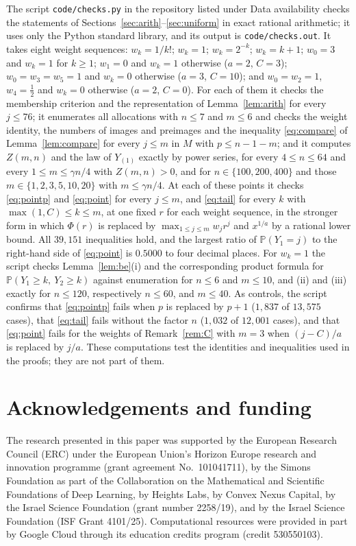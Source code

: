 \documentclass[11pt]{amsart}
\theoremstyle{remark}
\numberwithin{equation}{section}
\newcommand{\Pp}{\mathbb P}
\begin{document}
The script \texttt{code/checks.py} in the repository listed under Data availability checks the statements of Sections~\ref{sec:arith}--\ref{sec:uniform} in exact rational arithmetic; it uses only the Python standard library, and its output is \texttt{code/checks.out}. It takes eight weight sequences: $w_k=1/k!$; $w_k=1$; $w_k=2^{-k}$; $w_k=k+1$; $w_0=3$ and $w_k=1$ for $k\ge1$; $w_1=0$ and $w_k=1$ otherwise ($a=2$, $C=3$); $w_0=w_3=w_5=1$ and $w_k=0$ otherwise ($a=3$, $C=10$); and $w_0=w_2=1$, $w_4=\frac12$ and $w_k=0$ otherwise ($a=2$, $C=0$). For each of them it checks the membership criterion and the representation of Lemma~\ref{lem:arith} for every $j\le76$; it enumerates all allocations with $n\le7$ and $m\le6$ and checks the weight identity, the numbers of images and preimages and the inequality \eqref{eq:compare} of Lemma~\ref{lem:compare} for every $j\le m$ in $M$ with $p\le n-1-m$; and it computes $Z(m,n)$ and the law of $Y_{(1)}$ exactly by power series, for every $4\le n\le64$ and every $1\le m\le\gamma n/4$ with $Z(m,n)>0$, and for $n\in\{100,200,400\}$ and those $m\in\{1,2,3,5,10,20\}$ with $m\le\gamma n/4$. At each of these points it checks \eqref{eq:pointp} and \eqref{eq:point} for every $j\le m$, and \eqref{eq:tail} for every $k$ with $\max(1,C)\le k\le m$, at one fixed $r$ for each weight sequence, in the stronger form in which $\Phi(r)$ is replaced by $\max_{1\le j\le m}w_jr^j$ and $x^{1/a}$ by a rational lower bound. All $39{,}151$ inequalities hold, and the largest ratio of $\Pp(Y_1=j)$ to the right-hand side of \eqref{eq:point} is $0.5000$ to four decimal places. For $w_k=1$ the script checks Lemma~\ref{lem:be}(i) and the corresponding product formula for $\Pp(Y_1\ge k,\ Y_2\ge k)$ against enumeration for $n\le6$ and $m\le10$, and (ii) and (iii) exactly for $n\le120$, respectively $n\le60$, and $m\le40$. As controls, the script confirms that \eqref{eq:pointp} fails when $p$ is replaced by $p+1$ ($1{,}837$ of $13{,}575$ cases), that \eqref{eq:tail} fails without the factor $n$ ($1{,}032$ of $12{,}001$ cases), and that \eqref{eq:point} fails for the weights of Remark~\ref{rem:C} with $m=3$ when $(j-C)/a$ is replaced by $j/a$. These computations test the identities and inequalities used in the proofs; they are not part of them.

\section*{Acknowledgements and funding}
The research presented in this paper was supported by the European Research
Council (ERC) under the European Union's Horizon Europe research and
innovation programme (grant agreement No.~101041711), by the Simons
Foundation as part of the Collaboration on the Mathematical and Scientific
Foundations of Deep Learning, by Heights Labs, by Convex Nexus Capital, by
the Israel Science Foundation (grant number 2258/19), and by the Israel
Science Foundation (ISF Grant 4101/25). Computational resources were
provided in part by Google Cloud through its education credits program
(credit 530550103).
\end{document}
